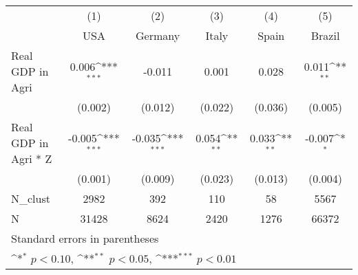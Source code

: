 {
\def\sym#1{\ifmmode^{#1}\else\(^{#1}\)\fi}
\begin{tabular}{l*{5}{c}}
\hline\hline
            &\multicolumn{1}{c}{(1)}&\multicolumn{1}{c}{(2)}&\multicolumn{1}{c}{(3)}&\multicolumn{1}{c}{(4)}&\multicolumn{1}{c}{(5)}\\
            &\multicolumn{1}{c}{USA}&\multicolumn{1}{c}{Germany}&\multicolumn{1}{c}{Italy}&\multicolumn{1}{c}{Spain}&\multicolumn{1}{c}{Brazil}\\
\hline
Real GDP in Agri&       0.006\sym{***}&      -0.011         &       0.001         &       0.028         &       0.011\sym{**} \\
            &     (0.002)         &     (0.012)         &     (0.022)         &     (0.036)         &     (0.005)         \\
[1em]
Real GDP in Agri * Z&      -0.005\sym{***}&      -0.035\sym{***}&       0.054\sym{**} &       0.033\sym{**} &      -0.007\sym{*}  \\
            &     (0.001)         &     (0.009)         &     (0.023)         &     (0.013)         &     (0.004)         \\
\hline
N\_clust     &        2982         &         392         &         110         &          58         &        5567         \\
N           &       31428         &        8624         &        2420         &        1276         &       66372         \\
\hline\hline
\multicolumn{6}{l}{\footnotesize Standard errors in parentheses}\\
\multicolumn{6}{l}{\footnotesize \sym{*} \(p<0.10\), \sym{**} \(p<0.05\), \sym{***} \(p<0.01\)}\\
\end{tabular}
}
